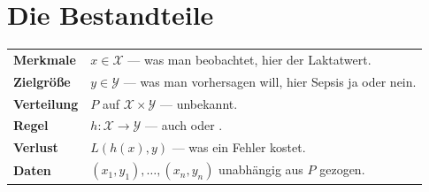 \begin{merksatz}
\begin{center}
\begin{minipage}{0.88\textwidth}
\end{minipage}
\end{center}
\end{merksatz}

\section{Die Bestandteile}

\begin{definition}
\begin{center}
{\small
\renewcommand{\arraystretch}{1.55}
\begin{tabular}{@{}P{2.6cm}P{6.0cm}@{}}
\toprule
\textbf{Merkmale} & $x \in \mathcal X$ --- was man beobachtet, hier der Laktatwert.\\
\textbf{Zielgröße} & $y \in \mathcal Y$ --- was man vorhersagen will, hier Sepsis ja oder nein.\\
\textbf{Verteilung} & $P$ auf $\mathcal X \times \mathcal Y$ --- \textcolor{akzent}{unbekannt}.\\
\textbf{Regel} & $h: \mathcal X \to \mathcal Y$ --- auch  oder .\\
\textbf{Verlust} & $L(h(x),y)$ --- was ein Fehler kostet.\\
\textbf{Daten} & $(x_1,y_1),\ldots,(x_n,y_n)$ unabhängig aus $P$ gezogen.\\
\bottomrule
\end{tabular}}
\end{center}
\end{definition}

